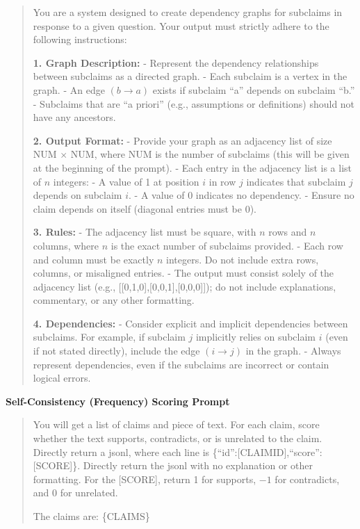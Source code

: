 \documentclass{uai2026} %
\theoremstyle{remark}
\theoremstyle{plain}
\theoremstyle{definition}
\begin{document}
\begin{quote}
You are a system designed to create dependency graphs for subclaims in response to a given question. Your output must strictly adhere to the following instructions:

\textbf{1. Graph Description:}
- Represent the dependency relationships between subclaims as a directed graph.
- Each subclaim is a vertex in the graph.
- An edge $(b \rightarrow a)$ exists if subclaim ``a'' depends on subclaim ``b.''
- Subclaims that are ``a priori'' (e.g., assumptions or definitions) should not have any ancestors.

\textbf{2. Output Format:}
- Provide your graph as an adjacency list of size NUM $\times$ NUM, where NUM is the number of subclaims (this will be given at the beginning of the prompt).
- Each entry in the adjacency list is a list of $n$ integers:
- A value of 1 at position $i$ in row $j$ indicates that subclaim $j$ depends on subclaim $i$.
- A value of 0 indicates no dependency.
- Ensure no claim depends on itself (diagonal entries must be 0).

\textbf{3. Rules:}
- The adjacency list must be square, with $n$ rows and $n$ columns, where $n$ is the exact number of subclaims provided.
- Each row and column must be exactly $n$ integers. Do not include extra rows, columns, or misaligned entries.
- The output must consist solely of the adjacency list (e.g., [[0,1,0],[0,0,1],[0,0,0]]); do not include explanations, commentary, or any other formatting.

\textbf{4. Dependencies:}
- Consider explicit and implicit dependencies between subclaims. For example, if subclaim $j$ implicitly relies on subclaim $i$ (even if not stated directly), include the edge $(i \rightarrow j)$ in the graph.
- Always represent dependencies, even if the subclaims are incorrect or contain logical errors.
\end{quote}

\textbf{Self-Consistency (Frequency) Scoring Prompt}

\begin{quote}
You will get a list of claims and piece of text. For each claim, score whether the text supports, contradicts, or is unrelated to the claim. Directly return a jsonl, where each line is \{``id'':[CLAIMID],``score'':[SCORE]\}. Directly return the jsonl with no explanation or other formatting. For the [SCORE], return 1 for supports, $-1$ for contradicts, and 0 for unrelated.

The claims are: \{CLAIMS\}
\end{quote}
\end{document}
